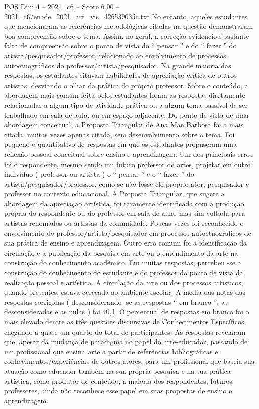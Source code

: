 \begin{textsample}{POS Dim 4 – 2021\_c6 – Score 6.00 – 2021\_c6/enade\_2021\_art\_vis\_426539035c.txt}
No entanto, aqueles estudantes que mencionaram as referências metodológicas citadas na questão demonstraram boa compreensão sobre o tema.
Assim, no geral, a correção evidenciou bastante falta de compreensão sobre o ponto de vista do “ pensar ” e do “ fazer ” do artista/pesquisador/professor, relacionado ao envolvimento de processos autoetnográficos do professor/artista/pesquisador.
Na grande maioria das respostas, os estudantes citavam habilidades de apreciação crítica de outros artistas, desviando o olhar da prática do próprio professor.
Sobre o conteúdo, a abordagem mais comum feita pelos estudantes foram as respostas diretamente relacionadas a algum tipo de atividade prática ou a algum tema passível de ser trabalhado em sala de aula, ou em espaço adjacente.
Do ponto de vista de uma abordagem conceitual, a Proposta Triangular de Ana Mae Barbosa foi a mais citada, muitas vezes apenas citada, sem desenvolvimento sobre o tema.
Foi pequeno o quantitativo de respostas em que os estudantes propuseram uma reflexão pessoal conceitual sobre ensino e aprendizagem.
Um dos principais erros foi o respondente, mesmo sendo um futuro professor de artes, projetar em outro indivíduo ( professor ou artista ) o “ pensar ” e o “ fazer ” do artista/pesquisador/professor, como se não fosse ele próprio ator, pesquisador e professor no contexto educacional.
A Proposta Triangular, que sugere a abordagem da apreciação artística, foi raramente identificada com a produção própria do respondente ou do professor em sala de aula, mas sim voltada para artistas renomados ou artistas da comunidade.
Poucas vezes foi reconhecido o envolvimento do professor/artista/pesquisador em processos autoetnográficos de sua prática de ensino e aprendizagem.
Outro erro comum foi a identificação da circulação e a publicação da pesquisa em arte ou o entendimento da arte na construção do conhecimento acadêmico.
Em muitas respostas, percebeu -se a construção do conhecimento do estudante e do professor do ponto de vista da realização pessoal e artística.
A circulação da arte ou dos processos artísticos, quando presentes, estava cerceada ao ambiente escolar.
A média das notas das respostas corrigidas ( desconsiderando -se as respostas “ em branco ”, as desconsideradas e as nulas ) foi 40,1.
O percentual de respostas em branco foi o mais elevado dentre as três questões discursivas de Conhecimentos Específicos, chegando a quase um quarto do total de participantes.
As respostas revelaram que, apesar da mudança de paradigma no papel do arte-educador, passando de um profissional que ensina arte a partir de referências bibliográficas e conhecimentos/experiências de outros atores, para um profissional que baseia sua atuação como educador também na sua própria pesquisa e na sua prática artística, como produtor de conteúdo, a maioria dos respondentes, futuros professores, ainda não reconhece esse papel em suas propostas de ensino e aprendizagem.

\end{textsample}
